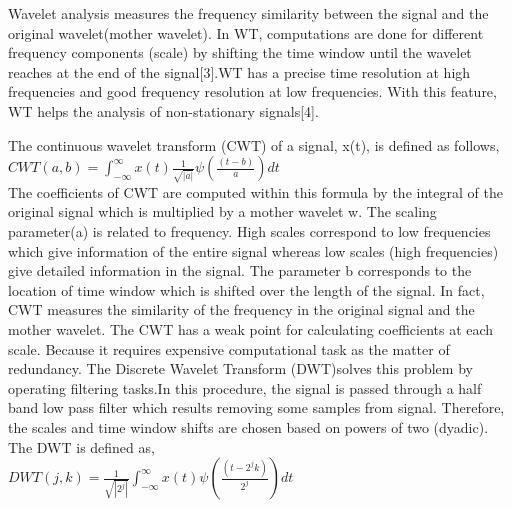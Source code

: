 \documentclass[a4paper, 11pt]{article} %
\begin{document}
Wavelet analysis measures the frequency similarity between the signal and the original wavelet(mother wavelet).
In WT, computations are done for different frequency components (scale) by shifting the time window until the wavelet reaches at the end of the signal[3].WT has a precise time resolution at high frequencies and good frequency resolution at low frequencies. With this feature, WT helps the analysis of non-stationary signals[4].


The continuous wavelet transform (CWT) of a signal, x(t), is defined as follows,  \\
$CWT(a,b)=\int_{-\infty}^{\infty} x(t)\frac{1}{\sqrt{|a|}}\psi(\frac{(t-b)}{a})dt$ \\

The coefficients of CWT are computed within this formula by the integral of the original signal which is multiplied by a mother wavelet w. The scaling parameter(a) is related to frequency. High scales correspond to low frequencies which give information of the entire signal whereas low scales (high frequencies) give detailed information in the signal. The parameter b corresponds to the location of time window which is shifted over the length of the signal. In fact, CWT measures the similarity of the frequency in the original signal and the mother wavelet.
The CWT has a weak point for calculating coefficients at each scale. Because it requires expensive computational task as the matter of redundancy.   
The Discrete Wavelet Transform (DWT)solves this problem by operating filtering tasks.In this procedure, the signal is passed through a half band low pass filter which results removing some samples from signal. Therefore, the scales and time window shifts are chosen based on powers of two (dyadic). The DWT is defined as,\\  

$DWT(j,k)=\frac{1}{\sqrt{|2^j|}}\int_{-\infty}^{\infty}x(t)\psi(\frac{(t-2^jk)}{2^j})dt$\\
\end{document}
